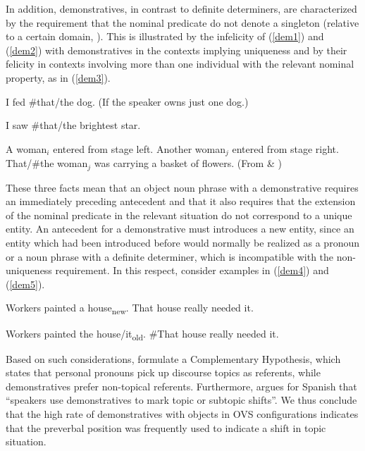 \documentclass[output=paper,modfonts,nonflat]{langsci/langscibook}
\begin{document}
In addition, demonstratives, in contrast to definite determiners, are characterized by the requirement that the nominal predicate do not denote a singleton (relative to a certain domain, \citealt{Corblin:1987}). This is illustrated by the infelicity of (\ref{dem1}) and (\ref{dem2}) with demonstratives in the contexts implying uniqueness and by their felicity in contexts involving more than one individual with the relevant nominal property, as in (\ref{dem3}).

\ea
I fed \#that/the dog. (If the speaker owns just one dog.)\label{dem1}
\z

\ea
I saw \#that/the brightest star.\label{dem2}
\z

\ea
 A woman$_{i}$ entered from stage left. Another woman$_{j}$ entered from stage right. That/\#the woman$_{j}$ was carrying a basket of flowers. \label{dem3} \hfill (From \citealt{Roberts:2002} \& \citealt[74]{Wolter:2006})
 \z

These three facts mean that an object noun phrase with a demonstrative requires an immediately preceding antecedent and that it also requires that the extension of the nominal predicate in the relevant situation do not correspond to a unique entity. An antecedent for a demonstrative must introduces a new entity, since an entity which had been introduced before would normally be realized as a pronoun or a noun phrase with a definite determiner, which is incompatible with the non-uniqueness requirement. In this respect, consider examples in (\ref{dem4}) and (\ref{dem5}).


\ea
Workers painted a house\textsubscript{new}. That house really needed it.\label{dem4}
\z

\ea
Workers painted the house/it\textsubscript{old}. \#That house really needed it.\label{dem5}
\z


Based on such considerations, \citet{BoschEtAl:2003} formulate a Complementary Hypothesis, which states that personal pronouns pick up discourse topics as referents, while demonstratives prefer non-topical referents. Furthermore, \citet[175]{Zulaica:2011} argues for Spanish that  ``speakers use demonstratives to mark topic or subtopic shifts''. We thus conclude that the high rate of demonstratives with objects in OVS configurations indicates that the preverbal position was frequently used to indicate a shift in topic situation. %
\end{document}
